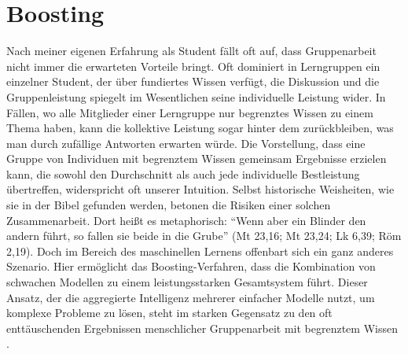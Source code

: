 \section{Boosting}
Nach meiner eigenen Erfahrung als Student fällt oft auf, dass Gruppenarbeit nicht immer die erwarteten Vorteile bringt. Oft dominiert in Lerngruppen ein einzelner Student, der über fundiertes Wissen verfügt, die Diskussion und die Gruppenleistung spiegelt im Wesentlichen seine individuelle Leistung wider. 
\newline
In Fällen, wo alle Mitglieder einer Lerngruppe nur begrenztes Wissen zu einem Thema haben, kann die kollektive Leistung sogar hinter dem zurückbleiben, was man durch zufällige Antworten erwarten würde. Die Vorstellung, dass eine Gruppe von Individuen mit begrenztem Wissen gemeinsam Ergebnisse erzielen kann, die sowohl den Durchschnitt als auch jede individuelle Bestleistung übertreffen, widerspricht oft unserer Intuition. Selbst historische Weisheiten, wie sie in der Bibel gefunden werden, betonen die Risiken einer solchen Zusammenarbeit. Dort heißt es metaphorisch: ``Wenn aber ein Blinder den andern führt, so fallen sie beide in die Grube'' (Mt 23,16; Mt 23,24; Lk 6,39; Röm 2,19).
\newline
\newline
Doch im Bereich des maschinellen Lernens offenbart sich ein ganz anderes Szenario. Hier ermöglicht das Boosting-Verfahren, dass die Kombination von schwachen Modellen zu einem leistungsstarken Gesamtsystem führt. Dieser Ansatz, der die aggregierte Intelligenz mehrerer einfacher Modelle nutzt, um komplexe Probleme zu lösen, steht im starken Gegensatz zu den oft enttäuschenden Ergebnissen menschlicher Gruppenarbeit mit begrenztem Wissen \cite[S.~3]{SchapireFreund2012}.


